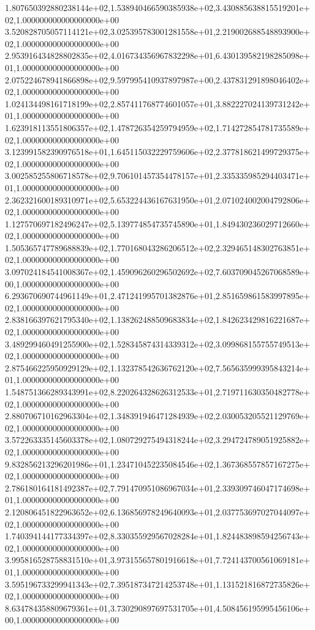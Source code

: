 1.807650392880238144e+02,1.538940466590385938e+02,3.430885638815519201e+02,1.000000000000000000e+00
3.520828705057114121e+02,3.025395783001281558e+01,2.219002688548893900e+02,1.000000000000000000e+00
2.953916434828802835e+02,4.016734356967832298e+01,6.430139582198285098e+01,1.000000000000000000e+00
2.075224678941866898e+02,9.597995410937897987e+00,2.437831291898046402e+02,1.000000000000000000e+00
1.024134498161718199e+02,2.857411768774601057e+01,3.882227024139731242e+01,1.000000000000000000e+00
1.623918113551806357e+02,1.478726354259794959e+02,1.714272854781735589e+02,1.000000000000000000e+00
3.123991582390976518e+01,1.645115032229759606e+02,2.377818621499729375e+02,1.000000000000000000e+00
3.002585255806718578e+02,9.706101457354478157e+01,2.335335985294403471e+01,1.000000000000000000e+00
2.362321600189310971e+02,5.653224436167631950e+01,2.071024002004792806e+02,1.000000000000000000e+00
1.127570697182496247e+02,5.139774854735745890e+01,1.849430236029712660e+02,1.000000000000000000e+00
1.505365747789688839e+02,1.770168043286206512e+02,2.329465148302763851e+02,1.000000000000000000e+00
3.097024184541008367e+02,1.459096260296502692e+02,7.603709045267068589e+00,1.000000000000000000e+00
6.293670690744961149e+01,2.471241995701382876e+01,2.851659861583997895e+02,1.000000000000000000e+00
2.838166397621795340e+02,1.138262488509683834e+02,1.842623429816221687e+02,1.000000000000000000e+00
3.489299460491255900e+02,1.528345874314339312e+02,3.099868155755749513e+02,1.000000000000000000e+00
2.875466225950929129e+02,1.132378542636762120e+02,7.565635999395843214e+01,1.000000000000000000e+00
1.548751366289343991e+02,8.220264328626312533e+01,2.719711630350482778e+02,1.000000000000000000e+00
2.880706710162963304e+02,1.348391946471284939e+02,2.030053205521129769e+02,1.000000000000000000e+00
3.572263335145603378e+02,1.080729275494318244e+02,3.294724789051925882e+02,1.000000000000000000e+00
9.832856213296201986e+01,1.234710452235084546e+02,1.367368557857167275e+02,1.000000000000000000e+00
2.786180164181492387e+02,7.791470951086967034e+01,2.339309746047174698e+01,1.000000000000000000e+00
2.120806451822963652e+02,6.136856978249640093e+01,2.037753697027044097e+02,1.000000000000000000e+00
1.740394144177334397e+02,8.330355929567028284e+01,1.824483898594256743e+02,1.000000000000000000e+00
3.995816528758831510e+01,3.973155657801916618e+01,7.724143700561069181e+01,1.000000000000000000e+00
3.595196733299941343e+02,7.395187347214253748e+01,1.131521816872735826e+02,1.000000000000000000e+00
8.634784358809679361e+01,3.730290897697531705e+01,4.508456195995456106e+00,1.000000000000000000e+00
